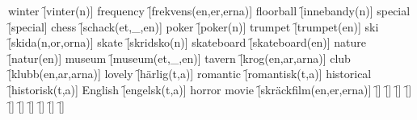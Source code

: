 \begin{questions}
\begin{multicols}{2}
        \question winter \f[vinter(n)]
        \question frequency \f[frekvens(en,er,erna)]
        \question floorball \f[innebandy(n)]
        \question special \f[special]
        \question chess \f[schack(et,\_,en)]
        \question poker \f[poker(n)]
        \question trumpet \f[trumpet(en)]
        \question ski \f[skida(n,or,orna)]
        \question skate \f[skridsko(n)]
        \question skateboard \f[skateboard(en)]
        \question nature \f[natur(en)]
        \question museum \f[museum(et,\_,en)]
        \question tavern \f[krog(en,ar,arna)]
        \question club \f[klubb(en,ar,arna)]
        \question lovely \f[härlig(t,a)]
        \question romantic \f[romantisk(t,a)]
        \question historical \f[historisk(t,a)]
        \question English \f[engelsk(t,a)]
        \question horror movie \f[skräckfilm(en,er,erna)]
        \question  \f[]
        \question  \f[]
        \question  \f[]
        \question  \f[]
        \question  \f[]
        \question  \f[]
        \question  \f[]
        \question  \f[]
        \question  \f[]
        \question  \f[]
    \end{multicols}
\end{questions}
